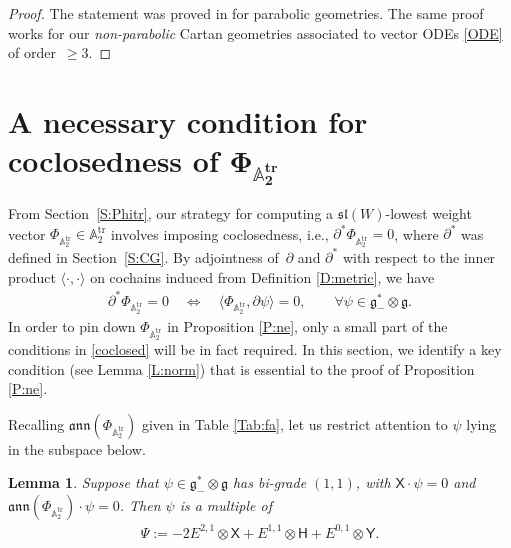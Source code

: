\documentclass[pdftex]{sigma}%
\newcommand\tensor{\otimes}
\DeclareMathOperator{\tr}{tr}
\newcommand{\g}{\mathfrak{g}}
\newcommand\fann{\mathfrak{ann}}
\newcommand\fg{\mathfrak{g}}
\newcommand\fsl{\mathfrak{sl}}
\newcommand\bbA{\mathbb{A}}
\newcommand\sfX{\mathsf{X}}
\newcommand\sfH{\mathsf{H}}
\newcommand\sfY{\mathsf{Y}}
\numberwithin{equation}{section}
\newtheorem{Lemma}[Theorem]{Lemma}
\begin{document}
\begin{proof}
The statement was proved in \cite[Theorem~3.1.12]{CS2009} for parabolic geometries. The same proof works for our {\em non-parabolic} Cartan geometries associated to vector ODEs \eqref{ODE} of order~${\ge 3}$.
\end{proof}

\section[A necessary condition for coclosedness of Phi\_\{A\_2\^{}\{tr\}\}]{A necessary condition for coclosedness of $\boldsymbol{\Phi_{\bbA_2^{\tr}}}$}\label{S:coclosed}

 From Section~\ref{S:Phitr}, our strategy for computing a $\fsl(W)$-lowest weight vector $\Phi_{\bbA_2^{\tr}} \in \bbA_2^{\tr}$ involves imposing coclosedness, i.e., $\partial^* \Phi_{\bbA_2^{\tr}} = 0$, where $\partial^*$ was defined in Section~\ref{S:CG}. By adjointness of~$\partial$ and $\partial^*$ with respect to the inner product $\langle \cdot, \cdot \rangle$ on cochains induced from Definition \ref{D:metric}, we have
\begin{align}\label{coclosed}
\partial^\ast \Phi_{\bbA_2^{\tr}} = 0 \quad \iff \quad \big\langle \Phi_{\bbA_2^{\tr}},
\partial \psi \big\rangle = 0, \qquad \forall \psi \in \g^*_- \tensor \g.
\end{align}
 In order to pin down $\Phi_{\bbA_2^{\tr}}$ in Proposition \ref{P:ne}, only a small part of the conditions in \eqref{coclosed} will be in fact required. In this section, we identify a key condition (see Lemma \ref{L:norm}) that is essential to the proof of Proposition \ref{P:ne}.

 Recalling
$\fann(\Phi_{\bbA_2^{\tr}})$ given in Table \ref{Tab:fa}, let us restrict attention to $\psi$ lying in the subspace below.

\begin{Lemma} \label{L:1-cochain}
Suppose that $\psi \in \fg_-^* \otimes \fg$ has bi-grade $(1,1)$, with $\sfX \cdot \psi = 0$ and $\fann(\Phi_{\bbA_2^{\tr}}) \cdot \psi = 0$. Then $\psi$ is a multiple of
\begin{align} \label{E:Psi}
\Psi:= -2E^{2,1} \tensor \sfX + E^{1,1} \tensor \sfH + E^{0,1} \tensor \sfY.
\end{align}
\end{Lemma}
\end{document}
